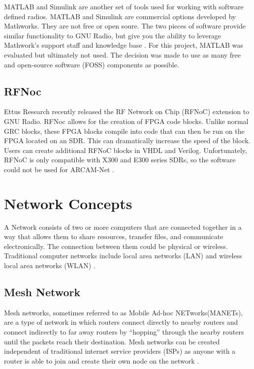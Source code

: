 MATLAB and Simulink are another set of tools used for working with software defined radios. MATLAB and Simulink are commercial options developed by Mathworks. They are not free or open soure. The two pieces of software provide similar functionality to GNU Radio, but give you the ability to leverage Mathwork's support staff and knowledge base \cite{0027}. For this project, MATLAB was evaluated but ultimately not used. The decision was made to use as many free and open-source software (FOSS) components as possible. 

\subsection{RFNoc}

Ettus Research recently released the RF Network on Chip (RFNoC) extension to GNU Radio. RFNoc allows for the creation of FPGA code blocks. Unlike normal GRC blocks, these FPGA blocks compile into code that can then be run on the FPGA located on an SDR. This can dramatically increase the speed of the block. Users can create additional RFNoC blocks in VHDL and Verilog. Unfortunately, RFNoC is only compatible with X300 and E300 series SDRs, so the software could not be used for ARCAM-Net \cite{0028}. 


\section{Network Concepts}

A Network consists of two or more computers that are connected together in a way that allows them to share resources, transfer files, and communicate electronically. The connection between them could be physical or wireless. Traditional computer networks include local area networks (LAN) and wireless local area networks (WLAN) \cite{529072} \cite{0029}. 

\subsection{Mesh Network}

Mesh networks, sometimes referred to as Mobile Ad-hoc NETworks(MANETs), are a type of network in which routers connect directly to nearby routers and connect indirectly to far away routers by ``hopping'' through the nearby routers until the packets reach their destination. Mesh networks can be created independent of traditional internet service providers (ISPs) as anyone with a router is able to join and create their own node on the network \cite{6908725}. 


